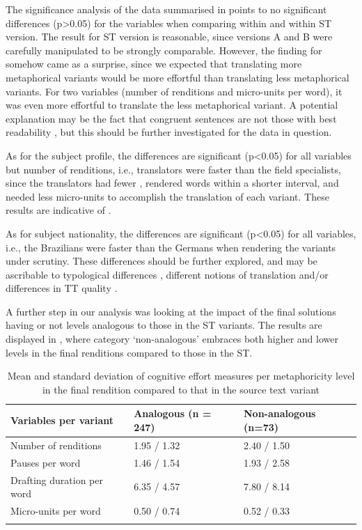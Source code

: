 \documentclass[output=paper]{LSP/langsci}
\begin{document}
\largerpage
The significance analysis of the data summarised in  points to no significant differences (p>0.05) for the variables when comparing within  and within ST version. The result for ST version is reasonable, since versions A and B were carefully manipulated to be strongly comparable. However, the finding for  somehow came as a surprise, since we expected that translating more metaphorical variants would be more effortful than translating less metaphorical variants. For two variables (number of renditions and micro-units per word), it was even more effortful to translate the less metaphorical variant. A potential explanation may be the fact that congruent sentences are not those with best readability \citep{Wolfer2015}, but this should be further investigated for the data in question.

As for the subject profile, the differences are significant (p<0.05) for all variables but number of renditions, i.e., translators were faster than the field specialists, since the translators had fewer , rendered words within a shorter interval, and needed less micro-units to accomplish the translation of each variant. These results are indicative of  \citep{Alves2007, PACTE2014}. 

As for subject nationality, the differences are significant (p<0.05) for all variables, i.e., the Brazilians were faster than the Germans when rendering the variants under scrutiny. These differences should be further explored, and may be ascribable to typological differences \citep{Steiner2001Intralingual, Steiner2001Translations}, different notions of translation \citep{Matthiessen2001, TirkkonenCondit2010} and/or differences in TT quality \citep{Alves2014Effortful}. 

A further step in our analysis was looking at the impact of the final solutions having or not  levels analogous to those in the ST variants. The results are displayed in , where category `non-analogous' embraces both higher and lower  levels in the final renditions compared to those in the ST.

\begin{table}
\footnotesize
\begin{tabularx}{\textwidth}{lXX}
\lsptoprule
Variables per variant & Analogous (n = 247) & Non-analogous (n=73)\\
\midrule
Number of renditions & 1.95 / 1.32 & 2.40 / 1.50\\
Pauses per word & 1.46 / 1.54 & 1.93 / 2.58\\
Drafting duration per word & 6.35 / 4.57 & 7.80 / 8.14\\
Micro-units per word & 0.50 / 0.74 & 0.52 / 0.33\\
\lspbottomrule
\end{tabularx}
\caption{Mean and standard deviation of cognitive effort measures per metaphoricity level in the final rendition compared to that in the source text variant}
\label{silva-pagano:tab:8}
\end{table}
\end{document}
